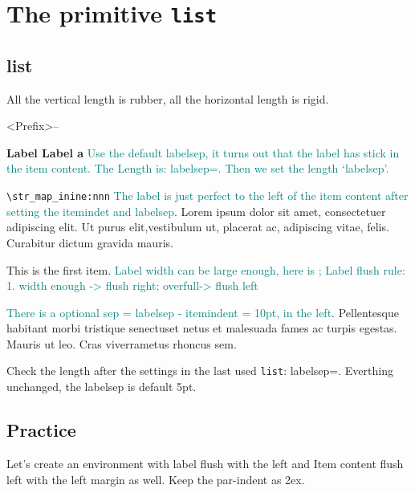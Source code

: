 \documentclass[draft]{article}
\def\useful#1{\textcolor{teal}{#1}}
\def\text{Lorem ipsum dolor sit amet, consectetuer adipiscing elit.%
Ut purus elit,vestib\-ulum ut, placerat ac, adipiscing vitae, felis. Curabitur dictum gravida%
mauris.}
\begin{document}
\section{The primitive \texttt{list}}
\subsection{list}
All the vertical length is rubber, all the horizontal length is rigid.

\begin{list}
  {<Prefix>--}
  {
  \setlength{\leftmargin}{0pt}
  \setlength{\rightmargin}{10em}
  \setlength{\labelsep}{\dimexpr.5em}
  \setlength{\labelwidth}{50em}
  \setlength{\itemindent}{\dimexpr 2ex+0ex}
  \setlength{\parsep}{3em plus .5em minus 1.5em}
  }
  \item[\textbf{Label Label a}] \useful{Use the default labelsep, it turns out that the label has stick in the item content. 
    The Length is: labelsep=\the\labelsep. Then we set the length `labelsep'.}
    \setlength{\labelsep}{2ex}
  \item[\texttt{\textbackslash str\_map\_inine:nnn}] \useful{The label is just perfect to the left of the item content after setting 
    the itemindet and labelsep}. \text
  \item This is the first item. \useful{Label width can be large enough, here is \the{}; Label flush rule: 1. width enough -> flush right; overfull-> flush left}
    \setlength{\labelsep}{\dimexpr2ex+10pt}
  \item \useful{There is a optional sep = labelsep - itemindent = 10pt, in the left}. Pellentesque habitant morbi tristique senectuset
  netus et malesuada fames ac turpis egestas. Mauris ut
  leo. Cras viverrametus rhoncus sem.
\end{list}

Check the length after the settings in the last used \texttt{list}: 
labelsep=\the{}. Everthing unchanged, the labelsep is default 5pt.

\subsection{Practice}
Let's create an environment with label flush with the left and Item content flush left with the left margin as well.
Keep the par-indent as 2ex.
\end{document}
